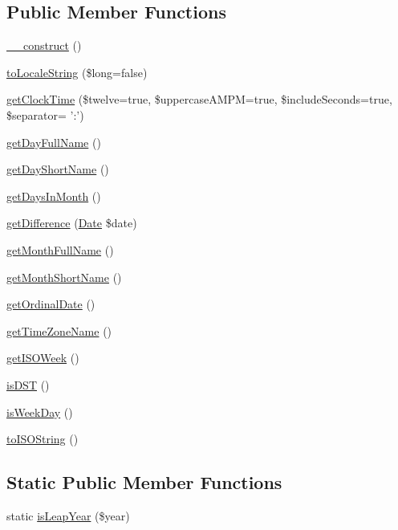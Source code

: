 \subsection*{Public Member Functions}
\begin{DoxyCompactItemize}
\item 
\hyperlink{class_date_extended_a095c5d389db211932136b53f25f39685}{\-\_\-\-\_\-construct} ()
\item 
\hyperlink{class_date_extended_ada04f8e683d2603d135fed9735e7ac99}{to\-Locale\-String} (\$long=false)
\item 
\hyperlink{class_date_extended_ad317baad95611ed5bb440a1ae0cbfca2}{get\-Clock\-Time} (\$twelve=true, \$uppercase\-A\-M\-P\-M=true, \$include\-Seconds=true, \$separator= '\-:')
\item 
\hyperlink{class_date_extended_adaa8912e7d6d6cefc74f16d1fc3e90ff}{get\-Day\-Full\-Name} ()
\item 
\hyperlink{class_date_extended_af60af39137441e44c6f5a48f6f6b35c7}{get\-Day\-Short\-Name} ()
\item 
\hyperlink{class_date_extended_a3d0fd2603e0e354a82599f4a4b64cdad}{get\-Days\-In\-Month} ()
\item 
\hyperlink{class_date_extended_a8ac07f5f64946195cf0eaefcce96d39c}{get\-Difference} (\hyperlink{class_date}{Date} \$date)
\item 
\hyperlink{class_date_extended_a8dcc7afa935fa9c20954ccc656ca1ec5}{get\-Month\-Full\-Name} ()
\item 
\hyperlink{class_date_extended_aa70331c580e7d796b142e67e3304be86}{get\-Month\-Short\-Name} ()
\item 
\hyperlink{class_date_extended_a6d4bef2c3db8a02c0557a4057bb50c43}{get\-Ordinal\-Date} ()
\item 
\hyperlink{class_date_extended_a5194835a8aba09ca0fe088498c23baab}{get\-Time\-Zone\-Name} ()
\item 
\hyperlink{class_date_extended_a0b13223a7fbee1de8db426e2d0b9af5e}{get\-I\-S\-O\-Week} ()
\item 
\hyperlink{class_date_extended_a3fb1e151cce42ceb23c43b46b3cb2f23}{is\-D\-S\-T} ()
\item 
\hyperlink{class_date_extended_a5287579ec8477780491f07569d88f7be}{is\-Week\-Day} ()
\item 
\hyperlink{class_date_extended_ab787217b18254240b44acd4b860760a1}{to\-I\-S\-O\-String} ()
\end{DoxyCompactItemize}
\subsection*{Static Public Member Functions}
\begin{DoxyCompactItemize}
\item 
static \hyperlink{class_date_extended_aad30ef308c5cb133adaf4607a15562c4}{is\-Leap\-Year} (\$year)
\end{DoxyCompactItemize}
